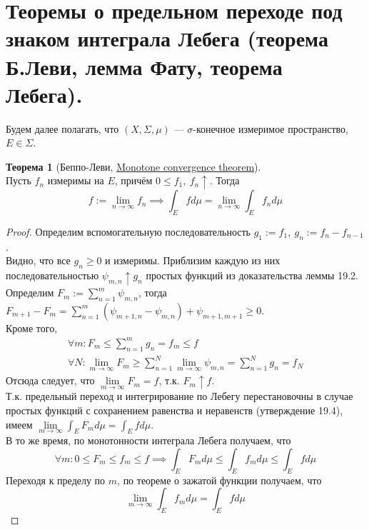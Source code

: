 \documentclass[11pt,a4paper]{report}
\theoremstyle{definition}
\theoremstyle{definition}
\newtheorem{theorem}{Теорема}[section]
\theoremstyle{definition}
\begin{document}
	\section{Теоремы о предельном переходе под знаком интеграла Лебега (теорема Б.Леви, лемма Фату, теорема Лебега).}
	Будем далее полагать, что $ (X, \Sigma, \mu) $ — $ \sigma $-конечное измеримое пространство, $ E \in \Sigma $.
	\begin{theorem}[Беппо-Леви, \href{https://goo.gl/M28P1b}{Monotone convergence theorem}]$  $\\
		Пусть $ f_{n} $ измеримы на $ E $, причём $ 0 \le f_{1},\ f_{n} \uparrow  $. Тогда 
		\[
			f := \lim\limits_{n\to\infty} f_{n} \implies \int_{E} f d\mu = \lim\limits_{n\to\infty} \int_{E} f_{n} d\mu
		\]
	\end{theorem}
	\begin{proof}	
		Определим вспомогательную последовательность $ g_{1} := f_{1},\ g_{n} := f_{n} - f_{n-1} $.\\
		Видно, что все $ g_{n} \ge 0 $ и измеримы. Приблизим каждую из них последовательностью $ \psi_{m, n} \uparrow g_{n} $  простых функций из доказательства леммы 19.2.\\
		Определим $ F_{m} := \sum\limits_{n=1}^{m} \psi_{m, n} $, тогда $ F_{m+1} - F_{m} = \sum\limits_{n=1}^{m}(\psi_{m+1, n} - \psi_{m, n}) + \psi_{m+1, m+1} \ge 0 $.\\
		Кроме того, 
		\begin{gather*} 
			\forall m: F_{m} \le \sum\limits_{n=1}^{m} g_{n} = f_{m} \le f\\
			\forall N: \lim\limits_{m\to\infty} F_{m} \ge \sum\limits_{n=1}^{N} \lim\limits_{m\to\infty} \psi_{m, n} = \sum\limits_{n=1}^{N} g_{n} = f_{N}
		\end{gather*}
		Отсюда следует, что $ \lim\limits_{m\to\infty} F_{m} = f $, т.к. $ F_{m} \uparrow f $.\\
		Т.к. предельный переход и интегрирование по Лебегу перестановочны в случае простых функций с сохранением равенства и неравенств (утверждение 19.4), имеем $ \lim\limits_{m\to\infty} \int_{E} F_{m} d\mu = \int_{E} f d\mu $.\\
		В то же время, по монотонности интеграла Лебега получаем, что
		\[
			\forall m: 0 \le F_{m} \le f_{m} \le f \implies \int_{E} F_{m} d\mu \le \int_{E} f_{m} d\mu \le \int_{E} f d\mu
		\]
		Переходя к пределу по $ m $, по теореме о зажатой функции получаем, что
		\[
			\lim\limits_{m\to\infty} \int_{E} f_{m} d\mu = \int_{E} f d\mu
		\]
	\end{proof}
\end{document}
